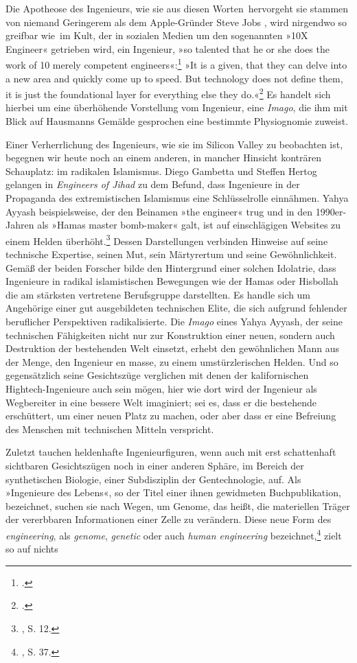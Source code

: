 \documentclass[%
	fontsize=10pt,%
	twoside,%
	headings=optiontoheadandtoc,%
	showtrims]{scrbook}
\renewcommand{\texttt}{\nohyphens} %
\begin{document}
\par Die Apotheose des Ingenieurs, wie sie aus diesen \texttt{Worten~her\-vorgeht} \textendash{} sie stammen von niemand Geringerem als dem Ap\-ple-Gründer Steve Jobs \textendash{}, wird nirgendwo so greifbar wie~im Kult, der in sozialen Medien um den sogenannten »10X Engineer« getrieben wird, ein Ingenieur, »so talented that he or she does the work of 10 merely competent engineers«:\footnote{\cite[][]{mcbride2013a}.}  »It is a given, that they can delve into a new area and quickly come up to speed. But technology does not define them, it is just the foundational layer for everything else they do.«\footnote{\cite[][]{ryan2016a}.}  Es handelt sich hierbei um eine überhöhende Vorstellung vom Ingenieur, eine \emph{Imago}, die ihm \textendash{} mit Blick auf Hausmanns Gemälde gesprochen \textendash{} eine bestimmte Physiognomie zuweist.\par Einer Verherrlichung des Ingenieurs, wie sie im Silicon Valley zu beobachten ist, begegnen wir heute noch an einem anderen, in mancher Hinsicht konträren Schauplatz: im radikalen \texttt{Islamismus.} Diego Gambetta und Steffen Hertog gelangen in \emph{Engineers of \texttt{Jihad}} zu dem Befund, dass Ingenieure in der Propaganda des extremistischen Islamismus eine Schlüsselrolle einnähmen. Yahya Ayyash beispielsweise, der den Beinamen »the engineer« trug und in den 1990er-Jahren als »Hamas master bomb-maker« galt, ist auf einschlägigen Websites zu einem Helden überhöht.\footnote{\cite[][]{gambetta2016a}, S. 12.}  Dessen Darstellungen verbinden Hinweise auf seine technische Expertise, seinen Mut, sein Märtyrertum und seine Gewöhnlichkeit. Gemäß der beiden Forscher bilde den Hintergrund einer solchen Idolatrie, dass Ingenieure in radikal islamistischen Bewegungen wie der Hamas oder Hisbollah die am stärksten vertretene Berufsgruppe darstellten. Es handle sich um Angehörige einer gut ausgebildeten technischen Elite, die sich aufgrund fehlender beruflicher Perspektiven radikalisierte. Die \emph{Imago} eines Yahya Ayyash, der seine technischen Fähigkeiten nicht nur zur Konstruktion einer neuen, sondern auch Destruktion der bestehenden Welt einsetzt, erhebt den gewöhnlichen Mann aus der Menge, den Ingenieur en masse, zu einem umstürzlerischen Helden. Und so gegensätzlich seine Gesichtszüge verglichen mit denen der kalifornischen Hightech-Ingenieure auch sein mögen, hier wie dort wird der Ingenieur als Wegbereiter in eine bessere Welt imaginiert; sei es, dass er die bestehende erschüttert, um einer neuen Platz zu machen, oder aber dass er eine Befreiung des Menschen mit technischen Mitteln verspricht.\par Zuletzt tauchen heldenhafte Ingenieurfiguren, wenn auch mit erst schattenhaft sichtbaren Gesichtszügen noch in einer an\-deren Sphäre, im Bereich der synthetischen Biologie, einer Subdisziplin der Gentechnologie, auf. Als »Ingenieure des Lebens«, so der Titel einer ihnen gewidmeten Buchpublikation, bezeichnet, suchen sie nach Wegen, um Genome, das heißt, die materiellen Träger der vererbbaren Informationen einer Zelle zu verändern. Diese neue Form des \emph{engineering}, als \emph{genome}, \emph{\texttt{genetic}} oder auch \emph{human engineering} bezeichnet,\footnote{\cite[][]{anders1980a}, S. 37.}  zielt so auf nichts 
\end{document}
